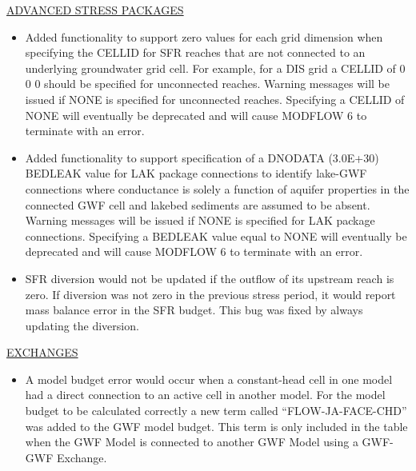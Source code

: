 	\underline{ADVANCED STRESS PACKAGES}
	\begin{itemize}
		\item Added functionality to support zero values for each grid dimension when specifying the CELLID for SFR reaches that are not connected to an underlying groundwater grid cell. For example, for a DIS grid a CELLID of 0 0 0 should be specified for unconnected reaches. Warning messages will be issued if NONE is specified for unconnected reaches. Specifying a CELLID of NONE will eventually be deprecated and will cause MODFLOW 6 to terminate with an error.
		\item Added functionality to support specification of a DNODATA (3.0E+30) BEDLEAK value for LAK package connections to identify lake-GWF connections where conductance is solely a function of aquifer properties in the connected GWF cell and lakebed sediments are assumed to be absent. Warning messages will be issued if NONE is specified for LAK package connections. Specifying a BEDLEAK value equal to NONE will eventually be deprecated and will cause MODFLOW 6 to terminate with an error.
		\item SFR diversion would not be updated if the outflow of its upstream reach is zero. If diversion was not zero in the previous stress period, it would report mass balance error in the SFR budget. This bug was fixed by always updating the diversion.
	\end{itemize}


	\underline{EXCHANGES}
	\begin{itemize}
		\item A model budget error would occur when a constant-head cell in one model had a direct connection to an active cell in another model.  For the model budget to be calculated correctly a new term called ``FLOW-JA-FACE-CHD'' was added to the GWF model budget.  This term is only included in the table when the GWF Model is connected to another GWF Model using a GWF-GWF Exchange.  
	\end{itemize}
